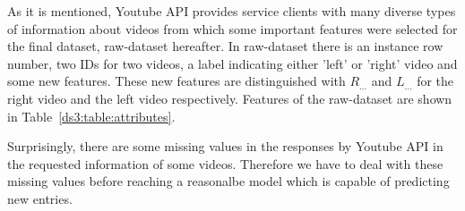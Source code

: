 As it is mentioned, Youtube API provides service clients with many diverse types
of information about videos from which some important features were selected for
the final dataset, raw-dataset hereafter. In raw-dataset there is an instance
row number, two IDs for two videos, a label indicating either 'left' or 'right'
video and some new features. These new features are distinguished with 
$R_{\ldots}$ and $L_{\ldots}$ for the right video and the left video
respectively.
Features of the raw-dataset are shown in Table~\ref{ds3:table:attributes}.

Surprisingly, there are some missing values in the responses by Youtube API in
the requested information of some videos. Therefore we have to deal with these
missing values before reaching a reasonalbe model which is capable of predicting
new entries.


